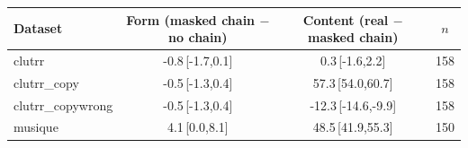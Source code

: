 \begin{tabular}{lccc}
\toprule
Dataset & Form (masked chain $-$ no chain) & Content (real $-$ masked chain) & $n$ \\
\midrule
clutrr & -0.8\,{\scriptsize[-1.7,0.1]} & 0.3\,{\scriptsize[-1.6,2.2]} & 158 \\
clutrr\_copy & -0.5\,{\scriptsize[-1.3,0.4]} & 57.3\,{\scriptsize[54.0,60.7]} & 158 \\
clutrr\_copywrong & -0.5\,{\scriptsize[-1.3,0.4]} & -12.3\,{\scriptsize[-14.6,-9.9]} & 158 \\
musique & 4.1\,{\scriptsize[0.0,8.1]} & 48.5\,{\scriptsize[41.9,55.3]} & 150 \\
\bottomrule
\end{tabular}
